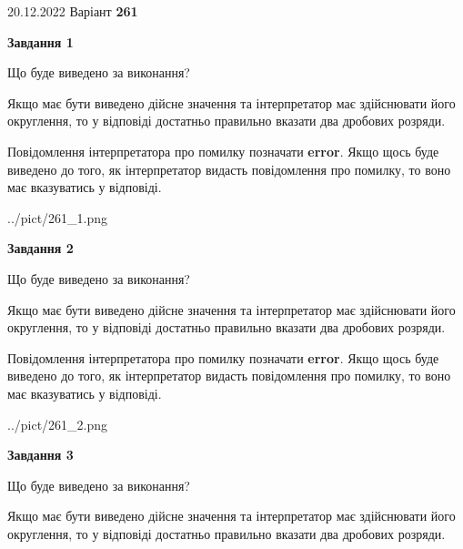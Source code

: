 \documentclass[12pt, ukrainian]{article}
\begin{document}
{20.12.2022 Варіант \No \textbf { 261 }\par}
{
\begin {Large}

{\begin {center}\textbf{Завдання 1}\end {center}}\par
Що буде виведено за виконання? \par

Якщо має бути виведено дійсне значення та інтерпретатор має здійснювати його округлення, 
то у відповіді достатньо правильно вказати два дробових розряди.

Повідомлення інтерпретатора про помилку позначати \textbf{error}.
Якщо щось буде виведено до того, як інтерпретатор видасть повідомлення про помилку, 
то воно має вказуватись у відповіді. \par

\begin{center}
	{../pict/261_1.png}
\end{center}
\newpage

{\begin {center}\textbf{Завдання 2}\end {center}}\par
Що буде виведено за виконання? \par

Якщо має бути виведено дійсне значення та інтерпретатор має здійснювати його округлення, 
то у відповіді достатньо правильно вказати два дробових розряди.

Повідомлення інтерпретатора про помилку позначати \textbf{error}.
Якщо щось буде виведено до того, як інтерпретатор видасть повідомлення про помилку, 
то воно має вказуватись у відповіді. \par

\begin{center}
	{../pict/261_2.png}
\end{center}
\newpage

{\begin {center}\textbf{Завдання 3}\end {center}}\par
Що буде виведено за виконання? \par

Якщо має бути виведено дійсне значення та інтерпретатор має здійснювати його округлення, 
то у відповіді достатньо правильно вказати два дробових розряди.


\end{Large}}
\end{document}
